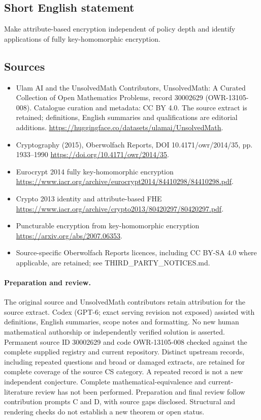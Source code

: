 \documentclass[11pt]{article}
\begin{document}
\subsection{Short English statement}
Make attribute-based encryption independent of policy depth and identify applications of fully key-homomorphic encryption.
\subsection{Sources}
\begin{itemize}
\item[\hypertarget{source:30002629:1}{S1}] Ulam AI and the UnsolvedMath Contributors, UnsolvedMath: A Curated Collection of Open Mathematics Problems, record 30002629 (OWR-13105-008). Catalogue curation and metadata: CC BY 4.0. The source extract is retained; definitions, English summaries and qualifications are editorial additions.
\url{https://huggingface.co/datasets/ulamai/UnsolvedMath}.
\item[\hypertarget{source:30002629:2}{S2}] Cryptography (2015), Oberwolfach Reports, DOI 10.4171/owr/2014/35, pp. 1933--1990
\url{https://doi.org/10.4171/owr/2014/35}.
\item[\hypertarget{source:30002629:3}{S3}] Eurocrypt 2014 fully key-homomorphic encryption
\url{https://www.iacr.org/archive/eurocrypt2014/84410298/84410298.pdf}.
\item[\hypertarget{source:30002629:4}{S4}] Crypto 2013 identity and attribute-based FHE
\url{https://www.iacr.org/archive/crypto2013/80420297/80420297.pdf}.
\item[\hypertarget{source:30002629:5}{S5}] Puncturable encryption from key-homomorphic encryption
\url{https://arxiv.org/abs/2007.06353}.
\item Source-specific Oberwolfach Reports licences, including CC BY-SA 4.0 where applicable, are retained; see THIRD\_PARTY\_NOTICES.md.
\end{itemize}
\paragraph{Preparation and review.}
The original source and UnsolvedMath contributors retain attribution for the source extract. Codex (GPT-6; exact serving revision not exposed) assisted with definitions, English summaries, scope notes and formatting. No new human mathematical authorship or independently verified solution is asserted. Permanent source ID 30002629 and code OWR-13105-008 checked against the complete supplied registry and current repository. Distinct upstream records, including repeated questions and broad or damaged extracts, are retained for complete coverage of the source CS category. A repeated record is not a new independent conjecture. Complete mathematical-equivalence and current-literature review has not been performed. Preparation and final review follow contribution prompts C and D, with source gaps disclosed. Structural and rendering checks do not establish a new theorem or open status.
\label{end:30002629}
\end{document}
